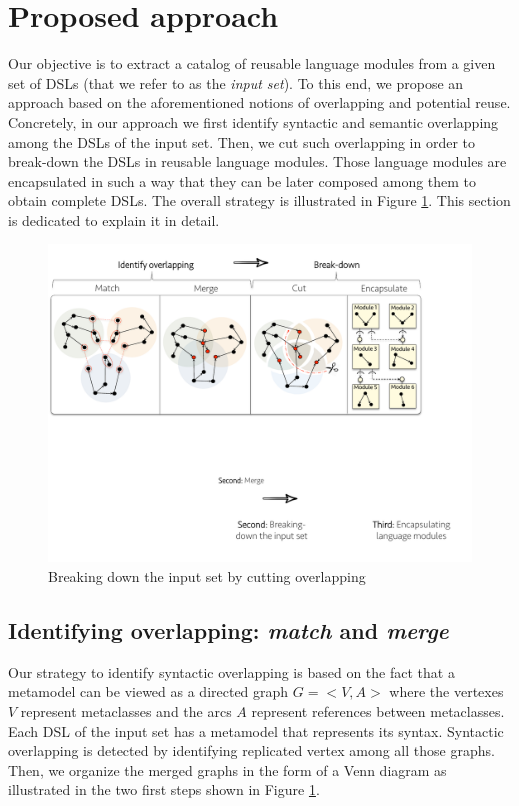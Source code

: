 \section{Proposed approach}
\label{sec:apprach}

Our objective is to extract a catalog of reusable language modules from a given set of DSLs (that we refer to as the \textit{input set}). To this end, we propose an approach based on the aforementioned notions of overlapping and potential reuse. Concretely, in our approach we first identify syntactic and semantic overlapping among the DSLs of the input set. Then, we cut such overlapping in order to break-down the DSLs in reusable language modules. Those language modules are encapsulated in such a way that they can be later composed among them to obtain complete DSLs. The overall strategy is illustrated in Figure \ref{fig:breakingdown}. This section is dedicated to explain it in detail.

\begin{figure}
\centering
\includegraphics[width=1\linewidth]{images/breakdown.pdf}
\caption{Breaking down the input set by cutting overlapping}
\label{fig:breakingdown}
\end{figure}

\subsection{Identifying overlapping: \textit{match} and \textit{merge}}
\label{sec:identifyingoverlapping}

Our strategy to identify syntactic overlapping is based on the fact that a metamodel can be viewed as a directed graph $G=<V,A>$ where the vertexes $V$ represent metaclasses and the arcs $A$ represent references between metaclasses. Each DSL of the input set has a metamodel that represents its syntax. Syntactic overlapping is detected by identifying replicated vertex among all those graphs. Then, we organize the merged graphs in the form of a Venn diagram as illustrated in the two first steps shown in Figure \ref{fig:breakingdown}.

